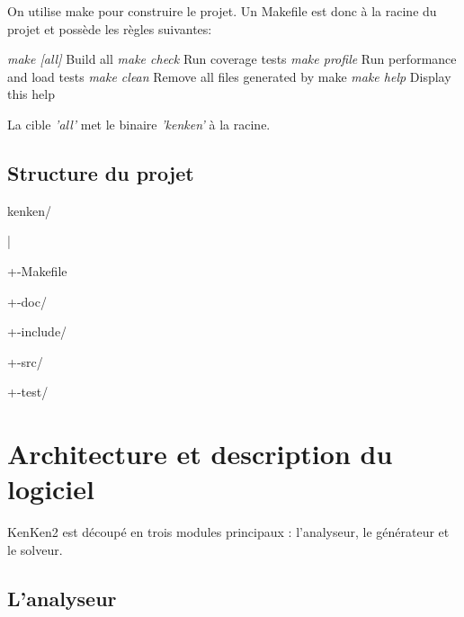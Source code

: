 \documentclass[1]{report}
\begin{document}
            On utilise make pour construire le projet. Un Makefile est donc à la racine du projet et possède les règles suivantes: \newline

            \textit{make [all]}    Build all \newline
            \textit{make check}    Run coverage tests \newline
            \textit{make profile}  Run performance and load tests \newline
            \textit{make clean}    Remove all files generated by make \newline
            \textit{make help}     Display this help \newline
            
            La cible \textit{'all'} met le binaire \textit{'kenken'} à la racine. \newline

        \section{Structure du projet}
            
            kenken/
            
                \quad | \newline
                
                \quad +-Makefile \newline
                
                \quad +-doc/ \newline
                
                \quad +-include/ \newline
                
                \quad +-src/ \newline
                
                \quad +-test/

\chapter{Architecture et description du logiciel}


     KenKen2 est découpé en trois modules principaux : l'analyseur, le générateur et le solveur.

    \section{L'analyseur}
\end{document}
